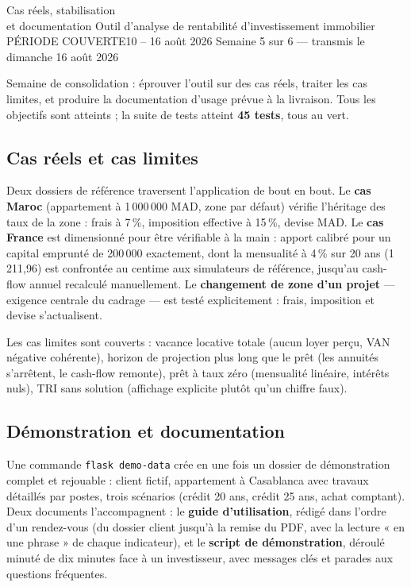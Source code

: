 \documentclass[11pt,a4paper]{article}
\begin{document}
	{Cas réels, stabilisation \\ et documentation}
	{Outil d'analyse de rentabilité d'investissement immobilier}
	{PÉRIODE COUVERTE}{10 -- 16 août 2026}
	{Semaine 5 sur 6 — transmis le dimanche 16 août 2026}


Semaine de consolidation : éprouver l'outil sur des cas réels, traiter les cas limites, et produire la documentation d'usage prévue à la livraison. Tous les objectifs sont atteints ; la suite de tests atteint \textbf{45 tests}, tous au vert.

\subsection{Cas réels et cas limites}
Deux dossiers de référence traversent l'application de bout en bout. Le \textbf{cas Maroc} (appartement à 1\,000\,000 MAD, zone par défaut) vérifie l'héritage des taux de la zone : frais à 7\,\%, imposition effective à 15\,\%, devise MAD. Le \textbf{cas France} est dimensionné pour être vérifiable à la main : apport calibré pour un capital emprunté de 200\,000 exactement, dont la mensualité à 4\,\% sur 20 ans (1\,211,96) est confrontée au centime aux simulateurs de référence, jusqu'au cash-flow annuel recalculé manuellement. Le \textbf{changement de zone d'un projet} — exigence centrale du cadrage — est testé explicitement : frais, imposition et devise s'actualisent.

Les cas limites sont couverts : vacance locative totale (aucun loyer perçu, VAN négative cohérente), horizon de projection plus long que le prêt (les annuités s'arrêtent, le cash-flow remonte), prêt à taux zéro (mensualité linéaire, intérêts nuls), TRI sans solution (affichage explicite plutôt qu'un chiffre faux).

\subsection{Démonstration et documentation}
Une commande \texttt{flask demo-data} crée en une fois un dossier de démonstration complet et rejouable : client fictif, appartement à Casablanca avec travaux détaillés par postes, trois scénarios (crédit 20 ans, crédit 25 ans, achat comptant). Deux documents l'accompagnent : le \textbf{guide d'utilisation}, rédigé dans l'ordre d'un rendez-vous (du dossier client jusqu'à la remise du PDF, avec la lecture « en une phrase » de chaque indicateur), et le \textbf{script de démonstration}, déroulé minuté de dix minutes face à un investisseur, avec messages clés et parades aux questions fréquentes.
\end{document}
